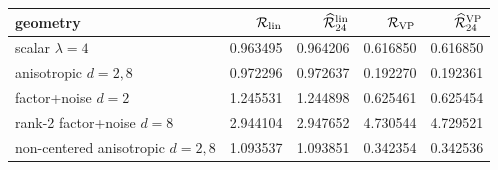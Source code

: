 \begin{tabular}{lrrrr}
\toprule
geometry & $\mathcal{R}_{\mathrm{lin}}$ & $\widehat{\mathcal{R}}_{24}^{\mathrm{lin}}$ & $\mathcal{R}_{\mathrm{VP}}$ & $\widehat{\mathcal{R}}_{24}^{\mathrm{VP}}$ \\
\midrule
scalar $\lambda=4$ & 0.963495 & 0.964206 & 0.616850 & 0.616850 \\
anisotropic $d=2,8$ & 0.972296 & 0.972637 & 0.192270 & 0.192361 \\
factor+noise $d=2$ & 1.245531 & 1.244898 & 0.625461 & 0.625454 \\
rank-2 factor+noise $d=8$ & 2.944104 & 2.947652 & 4.730544 & 4.729521 \\
non-centered anisotropic $d=2,8$ & 1.093537 & 1.093851 & 0.342354 & 0.342536 \\
\bottomrule
\end{tabular}
